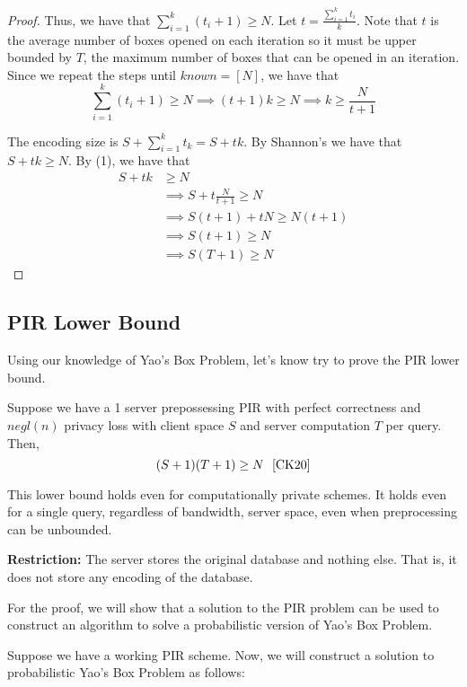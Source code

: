 \begin{proof}
    Thus, we have that $\sum_{i = 1}^k (t_i + 1)\ge N$. Let $t = \frac{\sum_{i = 1}^k t_i}{k}$. Note that $t$ is the average number of boxes opened on each iteration so it must be upper bounded by $T$, the maximum number of boxes that can be opened in an iteration. Since we repeat the steps until $known = [N]$, we have that
    \[\sum_{i = 1}^k (t_i + 1)\ge N \implies (t+1)k \ge N \implies k\ge \frac{N}{t+1} \tag{1}\]

    The encoding size is $S + \sum_{i=1}^k t_k = S + tk$. By Shannon's we have that $S + tk \ge N$. By (1), we have that 
    \begin{align*}
        S + tk &\ge N \\
        &\implies S + t \frac{N}{t+1} \ge N \tag{By (1)}\\
        &\implies S(t+1) + tN \ge N(t+1) \\
        &\implies S(t+1) \ge N \\
        &\implies S(T+1) \ge N \tag{As $t \le T$}
    \end{align*}
\end{proof}

\subsection{PIR Lower Bound}
Using our knowledge of Yao's Box Problem, let's know try to prove the PIR lower bound.
\begin{theorem}
    Suppose we have a 1 server prepossessing PIR with perfect correctness and $negl(n)$ privacy loss with client space $S$ and server computation $T$ per query. Then,
    \[(S+1)(T+1) \ge  N \ \ \cite{CK20}\]
\end{theorem}
This lower bound holds even for computationally private schemes. It holds even for a single query, regardless of bandwidth, server space, even when preprocessing can be unbounded.

\textbf{Restriction:} The server stores the original database and nothing else. That is, it does not store any encoding of the database.

\vspace{5mm}

For the proof, we will show that a solution to the PIR problem can be used to construct an algorithm to solve a probabilistic version of Yao's Box Problem.

Suppose we have a working PIR scheme. Now, we will construct a solution to probabilistic Yao's Box Problem as follows:

